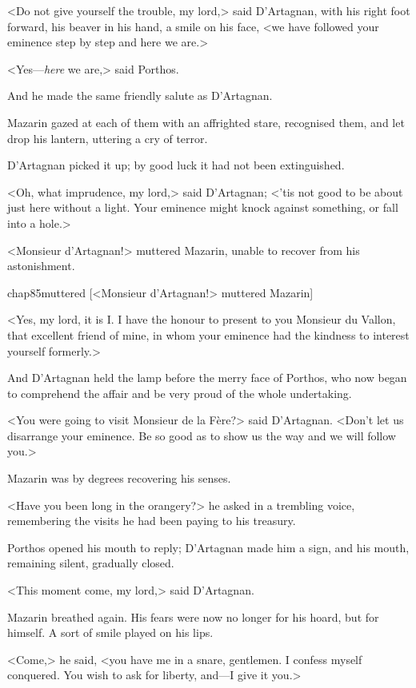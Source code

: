 <Do not give yourself the trouble, my lord,> said D'Artagnan, with his right foot forward, his beaver in his hand, a smile on his face, <we have followed your eminence step by step and here we are.>

<Yes—\textit{here} we are,> said Porthos.

And he made the same friendly salute as D'Artagnan.

Mazarin gazed at each of them with an affrighted stare, recognised them, and let drop his lantern, uttering a cry of terror.

D'Artagnan picked it up; by good luck it had not been extinguished.

<Oh, what imprudence, my lord,> said D'Artagnan; <'tis not good to be about just here without a light. Your eminence might knock against something, or fall into a hole.>

<Monsieur d'Artagnan!> muttered Mazarin, unable to recover from his astonishment.

\begin{bwbigpic}
	[\basicscale] 
	{chap85muttered}
	[<Monsieur d'Artagnan!> muttered Mazarin]
\end{bwbigpic}


<Yes, my lord, it is I. I have the honour to present to you Monsieur du Vallon, that excellent friend of mine, in whom your eminence had the kindness to interest yourself formerly.>

And D'Artagnan held the lamp before the merry face of Porthos, who now began to comprehend the affair and be very proud of the whole undertaking.

<You were going to visit Monsieur de la Fère?> said D'Artagnan. <Don't let us disarrange your eminence. Be so good as to show us the way and we will follow you.>

Mazarin was by degrees recovering his senses.

<Have you been long in the orangery?> he asked in a trembling voice, remembering the visits he had been paying to his treasury.

Porthos opened his mouth to reply; D'Artagnan made him a sign, and his mouth, remaining silent, gradually closed.

<This moment come, my lord,> said D'Artagnan.

Mazarin breathed again. His fears were now no longer for his hoard, but for himself. A sort of smile played on his lips.

<Come,> he said, <you have me in a snare, gentlemen. I confess myself conquered. You wish to ask for liberty, and—I give it you.>

